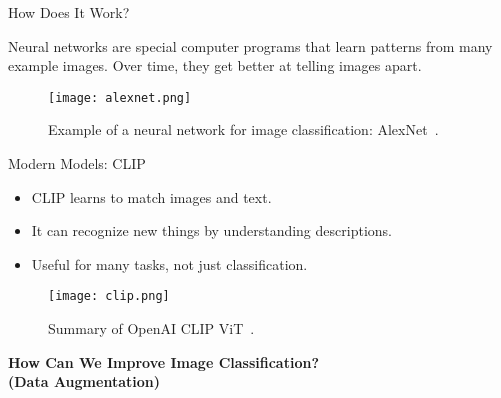 \begin{refsection}
\begin{frame}{How Does It Work?}
  \begin{flushleft}
  Neural networks are special computer programs that learn patterns from many example images. Over time, they get better at telling images apart.
  \end{flushleft}
  \centering
  \begin{figure}
    \centering
    \texttt{[image: alexnet.png]}
    \caption[]{\scriptsize Example of a neural network for image classification: AlexNet~\parencite{krizhevskyImageNetClassificationDeep2012}.}
  \end{figure}
  \bottomleftrefs
\end{frame}
\end{refsection}




\begin{refsection}
\begin{frame}{Modern Models: CLIP}
  \begin{itemize}
    \item CLIP learns to match images and text.
    \item It can recognize new things by understanding descriptions.
    \item Useful for many tasks, not just classification.
  \end{itemize}
  \centering
  \begin{figure}
    \centering
    \texttt{[image: clip.png]}
    \caption[]{\scriptsize Summary of OpenAI CLIP ViT~\parencite{radfordLearningTransferableVisual2021}.}
  \end{figure}
  \bottomleftrefs
\end{frame}
\end{refsection}



\begin{refsection}
\begin{frame}
  \centering
  \vspace{2.5cm}
  {\LARGE \textbf{How Can We Improve Image Classification?}\\[0.5em]
  \textbf{(Data Augmentation)}}
\end{frame}
\end{refsection}

